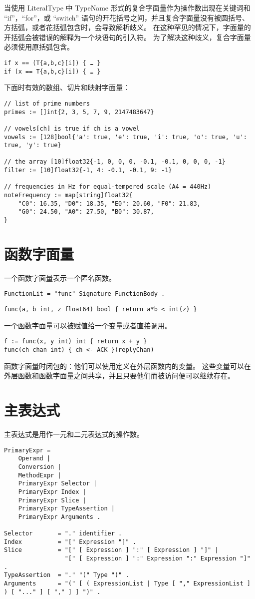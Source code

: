 当使用 LiteralType 中 TypeName 形式的复合字面量作为操作数出现在关键词和 ``if''，``for''，或 ``switch'' 语句的开花括号之间，并且复合字面量没有被圆括号、方括弧，或者花括弧包含时，会导致解析歧义。
在这种罕见的情况下，字面量的开括弧会被错误的解释为一个块语句的引入符。
为了解决这种歧义，复合字面量必须使用原括弧包含。
\begin{lstlisting}[style=golang]
if x == (T{a,b,c}[i]) { … }
if (x == T{a,b,c}[i]) { … }
\end{lstlisting}
下面时有效的数组、切片和映射字面量：
\begin{lstlisting}[style=golang]
// list of prime numbers
primes := []int{2, 3, 5, 7, 9, 2147483647}

// vowels[ch] is true if ch is a vowel
vowels := [128]bool{'a': true, 'e': true, 'i': true, 'o': true, 'u': true, 'y': true}

// the array [10]float32{-1, 0, 0, 0, -0.1, -0.1, 0, 0, 0, -1}
filter := [10]float32{-1, 4: -0.1, -0.1, 9: -1}

// frequencies in Hz for equal-tempered scale (A4 = 440Hz)
noteFrequency := map[string]float32{
	"C0": 16.35, "D0": 18.35, "E0": 20.60, "F0": 21.83,
	"G0": 24.50, "A0": 27.50, "B0": 30.87,
}
\end{lstlisting}


\section{函数字面量}
一个函数字面量表示一个匿名函数。
\begin{lstlisting}[style=EBNF]
FunctionLit = "func" Signature FunctionBody .
\end{lstlisting}

\begin{lstlisting}[style=golang]
func(a, b int, z float64) bool { return a*b < int(z) }
\end{lstlisting}
一个函数字面量可以被赋值给一个变量或者直接调用。
\begin{lstlisting}[style=golang]
f := func(x, y int) int { return x + y }
func(ch chan int) { ch <- ACK }(replyChan)
\end{lstlisting}
函数字面量时闭包的：他们可以使用定义在外层函数内的变量。
这些变量可以在外层函数和函数字面量之间共享，并且只要他们而被访问便可以继续存在。

\section{主表达式}
主表达式是用作一元和二元表达式的操作数。
\begin{lstlisting}[style=EBNF]
PrimaryExpr =
	Operand |
	Conversion |
	MethodExpr |
	PrimaryExpr Selector |
	PrimaryExpr Index |
	PrimaryExpr Slice |
	PrimaryExpr TypeAssertion |
	PrimaryExpr Arguments .

Selector       = "." identifier .
Index          = "[" Expression "]" .
Slice          = "[" [ Expression ] ":" [ Expression ] "]" |
                 "[" [ Expression ] ":" Expression ":" Expression "]" .
TypeAssertion  = "." "(" Type ")" .
Arguments      = "(" [ ( ExpressionList | Type [ "," ExpressionList ] ) [ "..." ] [ "," ] ] ")" .
\end{lstlisting}


